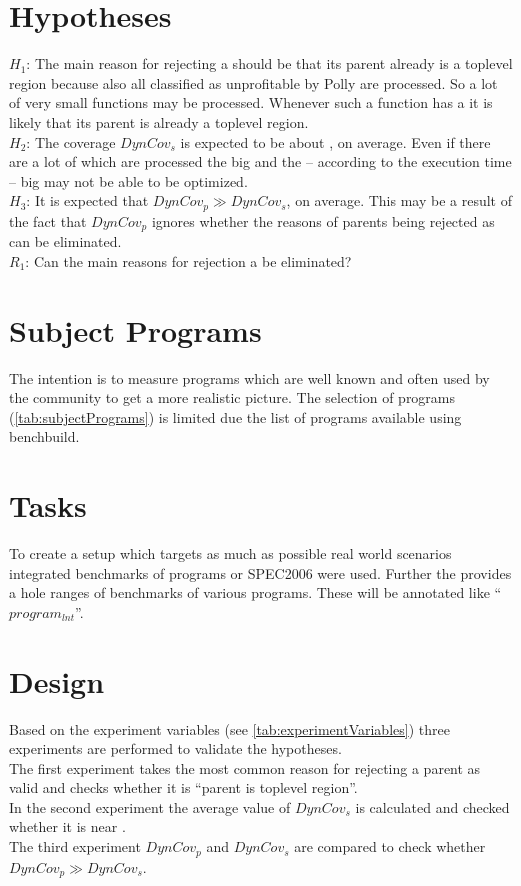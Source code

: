 \section{Hypotheses}
\(H_1\): The main reason for rejecting a \scop should be that its parent already is a toplevel region because also all \scops classified as unprofitable by Polly are processed.
So a lot of very small functions may be processed.
Whenever such a function has a \scop it is likely that its parent is already a toplevel region.\\
\(H_2\): The coverage \(DynCov_s\) is expected to be about \hTwoAbout, on average.
Even if there are a lot of \scops which are processed the big \scops and the -- according to the execution time -- big \scops may not be able to be optimized.\\
\(H_3\): It is expected that \(DynCov_p \gg DynCov_s\), on average.
This may be a result of the fact that \(DynCov_p\) ignores whether the reasons of parents being rejected as \scop can be eliminated.\\
\(R_1\): Can the main reasons for rejection a \scop be eliminated?

\section{Subject Programs}
The intention is to measure programs which are well known and often used by the community to get a more realistic picture.
The selection of programs (\autoref{tab:subjectPrograms}) is limited due the list of programs available using benchbuild.

\section{Tasks}
To create a setup which targets as much as possible real world scenarios integrated benchmarks of programs or SPEC2006 were used.
Further the \lnt provides a hole ranges of benchmarks of various programs.
These will be annotated like \enquote{\(program_{lnt}\)}.

\section{Design}
Based on the experiment variables (see \autoref{tab:experimentVariables}) three experiments are performed to validate the hypotheses.\\
The first experiment takes the most common reason for rejecting a parent as valid \scop and checks whether it is \enquote{parent is toplevel region}.\\
In the second experiment the average value of \(DynCov_s\) is calculated and checked whether it is near \hTwoAbout.\\
The third experiment \(DynCov_p\) and \(DynCov_s\) are compared to check whether \(DynCov_p \gg DynCov_s\).

